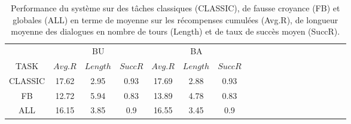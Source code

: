 \documentclass[a4paper,11pt,twoside]{StyleThese}
\begin{document}



\begin{table}
 \vspace{-10pt}
\centering
\scriptsize
\renewcommand{\arraystretch}{1.2}
\begin{tabular}{c|*{3}{c|cc||}*{3}{c|cc|}}
\multicolumn{1}{c}{} & \multicolumn{3}{c}{BU} & \multicolumn{3}{c}{BA} \\
TASK  & $Avg.R$ & $Length$ & $SuccR$  
      & $Avg.R$ & $Length$ & $SuccR$  \\ 
\hline
 	CLASSIC & 17.62 & 2.95 & 0.93 
            & 17.69 & 2.88 &  0.93 \\
   	FB	& 12.72 & 5.94 &  0.83 
        & 13.89 & 4.78&  0.83	 \\
    \hline
    ALL & 16.15 & 3.85&  0.9 
        & 16.55 & 3.45& 0.9 \\
\end{tabular}
\caption{Performance du système sur des tâches classiques (CLASSIC), de fausse croyance (FB) et globales (ALL) en terme de moyenne sur les récompenses cumulées
 (Avg.R), de longueur moyenne des dialogues en nombre de tours (Length) et de taux de succès moyen (SuccR).}
 \label{table:hri-perfs}    
 \vspace{-10pt}
\end{table}
\end{document}
